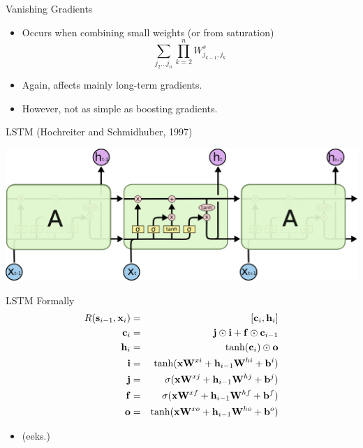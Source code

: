\documentclass{beamer}
\begin{document}
\begin{frame}{Vanishing Gradients}
  \begin{itemize}
  \item Occurs when combining small weights (or from saturation)
    \[\sum_{j_2 \ldots j_n} \prod_{k=2}^n W^s_{j_{k-1},j_k} \] 
    \air 
  \item Again, affects mainly long-term gradients.
    \air 

  \item However, not as simple as boosting gradients.
  \end{itemize}
\end{frame}

\begin{frame}{LSTM (Hochreiter and Schmidhuber, 1997)}
  \begin{center}
    \includegraphics[width=\textwidth]{LSTM3-chain}
  \end{center}
\end{frame}



\begin{frame}{LSTM Formally}
  \begin{eqnarray*}
    R(\bold {\mathbf{s}}_{i-1}, \mathbf{x}_i) &=& [\mathbf{c}_i, \mathbf{h}_i]  \\
    \mathbf{c}_i &=& \mathbf{j} \odot \mathbf{i}  + \bold f \odot \bold c_{i-1}    \\
    \mathbf{h}_i &=& \tanh(\mathbf{c}_i) \odot \mathbf{o}\\ 
    \mathbf{i} &=& \tanh(\mathbf{x} \mathbf{W}^{xi} + \mathbf{h}_{i-1}\mathbf{W}^{hi} + \mathbf{b}^i) \\
    \mathbf{j} &=& \sigma(\mathbf{x} \mathbf{W}^{xj} + \mathbf{h}_{i-1}\mathbf{W}^{hj} + \mathbf{b}^j) \\
    \mathbf{f} &=& \sigma(\mathbf{x} \mathbf{W}^{xf} + \mathbf{h}_{i-1}\mathbf{W}^{hf} + \mathbf{b}^f) \\
    \mathbf{o} &=& \tanh(\mathbf{x} \mathbf{W}^{xo} + \mathbf{h}_{i-1}\mathbf{W}^{ho} + \mathbf{b}^o) \\
  \end{eqnarray*}
  \begin{itemize}
    \item (eeks.)
  \end{itemize}
\end{frame}
\end{document}
